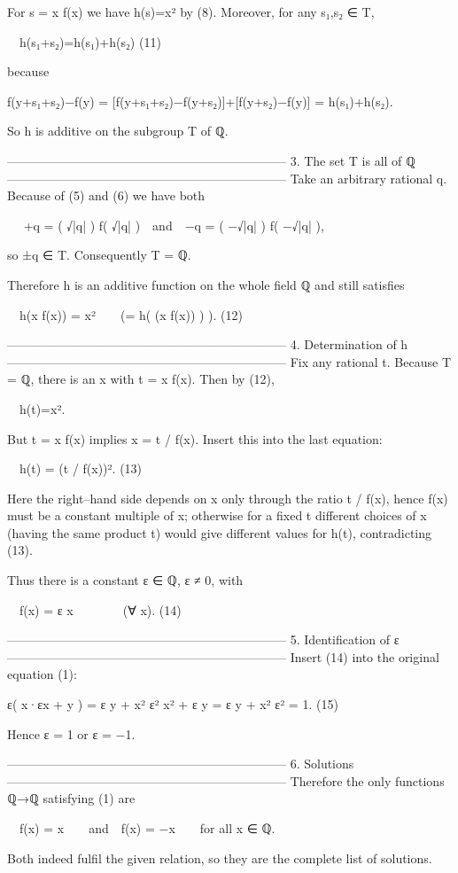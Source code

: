 For s = x f(x) we have h(s)=x² by (8).  
Moreover, for any s₁,s₂ ∈ T,

 h(s₁+s₂)=h(s₁)+h(s₂)                                          (11)

because

  f(y+s₁+s₂)−f(y) = [f(y+s₁+s₂)−f(y+s₂)]+[f(y+s₂)−f(y)]
                   = h(s₁)+h(s₂).

So h is additive on the subgroup T of ℚ.


--------------------------------------------------------------------
3.  The set T is all of ℚ
--------------------------------------------------------------------
Take an arbitrary rational q.  
Because of (5) and (6) we have both

  +q = ( √|q| ) f( √|q| ) and −q = ( −√|q| ) f( −√|q| ),

so ±q ∈ T.  
Consequently T = ℚ.

Therefore h is an additive function on the whole field ℚ and still satisfies

 h(x f(x)) = x²  (= h( (x f(x)) ) ).                          (12)

--------------------------------------------------------------------
4.  Determination of h
--------------------------------------------------------------------
Fix any rational t.  
Because T = ℚ, there is an x with t = x f(x).  
Then by (12),

 h(t)=x².

But t = x f(x) implies x = t / f(x).  
Insert this into the last equation:

 h(t) = (t / f(x))².                                            (13)

Here the right–hand side depends on x only through the ratio t / f(x),
hence f(x) must be a constant multiple of x; otherwise for a fixed
t different choices of x (having the same product t) would give different
values for h(t), contradicting (13).

Thus there is a constant ε ∈ ℚ, ε ≠ 0, with

 f(x) = ε x    (∀ x).                                         (14)

--------------------------------------------------------------------
5.  Identification of ε
--------------------------------------------------------------------
Insert (14) into the original equation (1):

   ε( x·εx + y ) = ε y + x²
   ε² x² + ε y   = ε y + x²
             ε² = 1.                                             (15)

Hence ε = 1 or ε = −1.

--------------------------------------------------------------------
6.  Solutions
--------------------------------------------------------------------
Therefore the only functions ℚ→ℚ satisfying (1) are

 f(x) =  x  and f(x) = −x  for all x ∈ ℚ.

Both indeed fulfil the given relation, so they are the complete list of solutions.